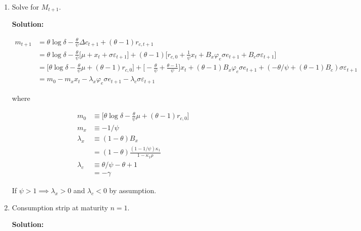\documentclass{article}
\begin{document}
\begin{enumerate}
\pagebreak

\item Solve for $M_{t+1}$.

\bigskip

\textbf{Solution:} 

\begin{align*}
m_{t+1} 
&= \theta \log \delta - \frac{\theta}{\psi} \Delta c_{t+1} + (\theta - 1)r_{c,t+1}\\
&= \theta \log \delta - \frac{\theta}{\psi} \Bigg[\mu + x_t + \sigma \varepsilon_{t+1} \Bigg] + (\theta - 1)\Bigg[r_{c,0} +  \frac{1}{\psi} x_t  + B_x \varphi_e \sigma e_{t+1} + B_c \sigma \varepsilon_{t+1}\Bigg]\\
&= \Bigg[\theta \log \delta - \frac{\theta}{\psi} \mu + (\theta - 1) r_{c,0}\Bigg]
+ \Bigg[-\frac{\theta}{\psi} + \frac{\theta - 1}{\psi} \Bigg] x_t
+ (\theta - 1)B_x \varphi_e \sigma e_{t+1}
+ (-\theta/\psi + (\theta - 1)B_c) \sigma \varepsilon_{t+1}\\
&= m_0 - m_x x_t -\lambda_x \varphi_e \sigma e_{t+1} - \lambda_c \sigma \varepsilon_{t+1}
\end{align*}

where

\begin{align*}
m_0 &\equiv \Bigg[\theta \log \delta - \frac{\theta}{\psi} \mu + (\theta - 1) r_{c,0}\Bigg]\\
m_x &\equiv -1/\psi \\
\lambda_x 
&\equiv (1 - \theta) B_x\\
&= (1 - \theta )\frac{(1-1/\psi)\kappa_1 }{1- \kappa_1 \rho}\\
\lambda_c 
&\equiv \theta/\psi - \theta + 1 \\
&= - \gamma
\end{align*}

If $\psi > 1 \implies \lambda_x > 0$ and $\lambda_c < 0$ by assumption.

\bigskip

\item Consumption strip at maturity $n = 1$.

\bigskip

\textbf{Solution:}


\end{enumerate}
\end{document}
